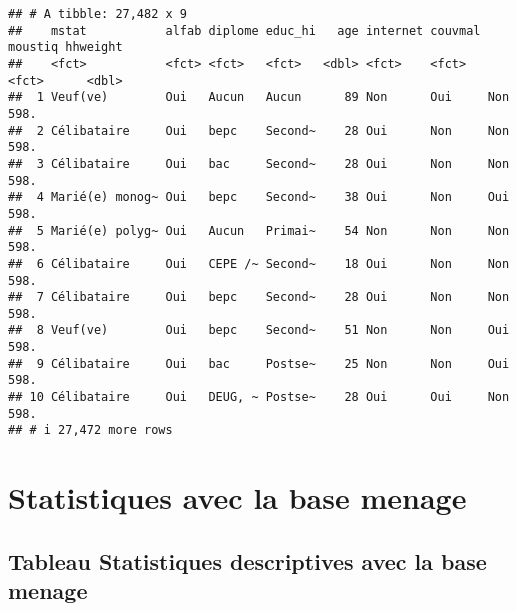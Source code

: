 \documentclass[
]{article}
\begin{document}
\begin{verbatim}
## # A tibble: 27,482 x 9
##    mstat           alfab diplome educ_hi   age internet couvmal moustiq hhweight
##    <fct>           <fct> <fct>   <fct>   <dbl> <fct>    <fct>   <fct>      <dbl>
##  1 Veuf(ve)        Oui   Aucun   Aucun      89 Non      Oui     Non         598.
##  2 Célibataire     Oui   bepc    Second~    28 Oui      Non     Non         598.
##  3 Célibataire     Oui   bac     Second~    28 Oui      Non     Non         598.
##  4 Marié(e) monog~ Oui   bepc    Second~    38 Oui      Non     Oui         598.
##  5 Marié(e) polyg~ Oui   Aucun   Primai~    54 Non      Non     Non         598.
##  6 Célibataire     Oui   CEPE /~ Second~    18 Oui      Non     Non         598.
##  7 Célibataire     Oui   bepc    Second~    28 Oui      Non     Non         598.
##  8 Veuf(ve)        Oui   bepc    Second~    51 Non      Non     Oui         598.
##  9 Célibataire     Oui   bac     Postse~    25 Non      Non     Oui         598.
## 10 Célibataire     Oui   DEUG, ~ Postse~    28 Oui      Oui     Non         598.
## # i 27,472 more rows
\end{verbatim}

\section{Statistiques avec la base
menage}\label{statistiques-avec-la-base-menage}

\subsection{Tableau Statistiques descriptives avec la base
menage}\label{tableau-statistiques-descriptives-avec-la-base-menage}
\end{document}
